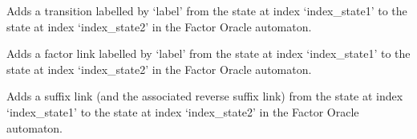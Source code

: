 \documentclass[letterpaper,10pt,english]{sphinxmanual}
\begin{document}
\begin{fulllineitems}
\begin{sphinxVerbatim}[commandchars=\\\{\}]
    
\end{sphinxVerbatim}

\begin{fulllineitems}
\label{\detokenize{index:Model.FactorOracle.add_direct_transition}}
Adds a transition labelled by ‘label’ from the state at index ‘index\_state1’ to the state at index ‘index\_state2’ in the Factor Oracle automaton.

\end{fulllineitems}


\begin{fulllineitems}
\label{\detokenize{index:Model.FactorOracle.add_factor_link}}
Adds a factor link labelled by ‘label’ from the state at index ‘index\_state1’ to the state at index ‘index\_state2’ in the Factor Oracle automaton.

\end{fulllineitems}


\begin{fulllineitems}
\label{\detokenize{index:Model.FactorOracle.add_suffix_link}}
Adds a suffix link (and the associated reverse suffix link) from the state at index ‘index\_state1’ to the state at index ‘index\_state2’ in the Factor Oracle automaton.

\end{fulllineitems}



\end{fulllineitems}
\end{document}
